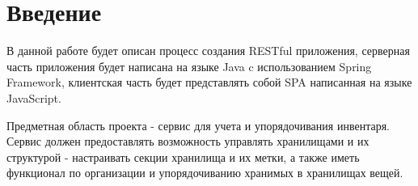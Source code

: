\hypertarget{ux432ux432ux435ux434ux435ux43dux438ux435}{%
\section{Введение}\label{ux432ux432ux435ux434ux435ux43dux438ux435}}

В данной работе будет описан процесс создания RESTful приложения,
серверная часть приложения будет написана на языке Java c использованием
Spring Framework, клиентская часть будет представлять собой SPA
написанная на языке JavaScript.

Предметная область проекта - сервис для учета и упорядочивания
инвентаря. Сервис должен предоставлять возможность управлять хранилищами
и их структурой - настраивать секции хранилища и их метки, а также иметь
функционал по организации и упорядочиванию хранимых в хранилищах вещей.
